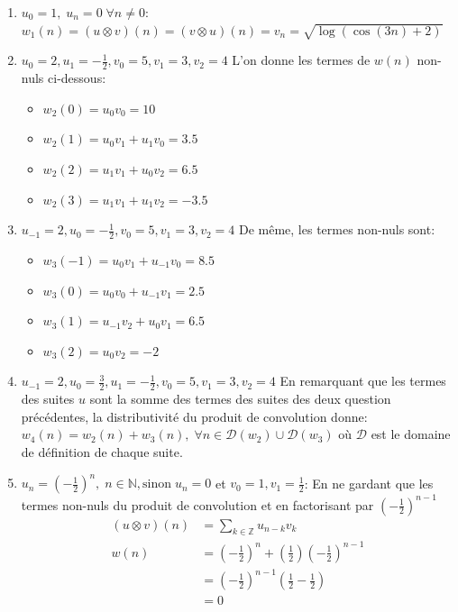 \documentclass[12pt]{article}
\begin{document}
\begin{enumerate}
\item $u_0 = 1, \; u_n = 0 \; \forall n \neq 0$: \newline
$w_1(n) = (u \otimes v)(n) = (v \otimes u)(n) = v_n = \sqrt{\log(\cos(3n)+2)}$ 
\item $u_0 = 2, u_1 = - \frac{1}{2} , v_0 = 5, v_1 = 3, v_2 = 4$ \newline
L'on donne les termes de $w(n)$ non-nuls ci-dessous:
\begin{itemize}
\item $w_2(0) = u_0 v_0 = 10$
\item $w_2(1) = u_0 v_1 + u_1 v_0 = 3.5$
\item $w_2(2) = u_1 v_1 + u_0 v_2 = 6.5$
\item $w_2(3) = u_1 v_1 + u_1 v_2 = - 3.5$
\end{itemize}
\item $u_{-1} = 2, u_0 = - \frac{1}{2} , v_0 = 5, v_1 = 3, v_2 = 4$ \newline
De même, les termes non-nuls sont:
\begin{itemize}
\item $w_3(-1) = u_0 v_1 + u_{-1} v_0 = 8.5$
\item $w_3(0) = u_0 v_0 + u_{-1} v_1 = 2.5$
\item $w_3(1) = u_{-1} v_2 + u_0 v_1 = 6.5$
\item $w_3(2) = u_0 v_2 = -2$
\end{itemize}
\item $u_{-1} = 2, u_0 = \frac{3}{2}, u_1 = - \frac{1}{2}, v_0 = 5, v_1 = 3, v_2 = 4$ \newline 
En remarquant que les termes des suites $u$ sont la somme des termes des suites des deux question précédentes, la distributivité du produit de convolution donne: 
$w_4(n) = w_2(n) + w_3(n), \; \forall n \in \mathcal{D}(w_2) \cup \mathcal{D}(w_3)$ 
où $\mathcal{D}$ est le domaine de définition de chaque suite.
\item $u_n = (-\frac{1}{2})^n, \; n \in \mathbb{N}, \text{sinon} \; u_n = 0$ et $v_0 = 1, v_1 = \frac{1}{2}$: \newline
En ne gardant que les termes non-nuls du produit de convolution et en factorisant par $(-\frac{1}{2})^{n-1}$
\begin{equation*}\begin{split}
(u \otimes v)(n) &= \sum_{k \in \mathbb{Z}} u_{n-k}v_k \\
		w(n)	 &= (-\frac{1}{2})^n + (\frac{1}{2})(-\frac{1}{2})^{n-1} \\
				 &= (-\frac{1}{2})^{n-1}(\frac{1}{2}-\frac{1}{2}) \\
				 &= 0
\end{split}\end{equation*}
\end{enumerate}
\end{document}
